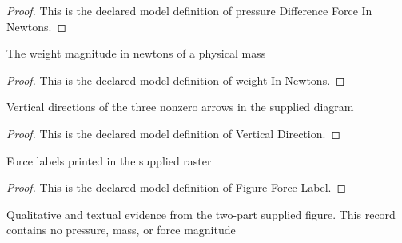 \begin{proof}
  This is the declared model definition of pressure Difference Force In Newtons.
\end{proof}
\begin{definition}
  \label{def:physics:phyx-mini-0720:phyxminiproblems-problemphyxmini0720-weightinnewtons}
  The weight magnitude in newtons of a physical mass
\end{definition}
\begin{proof}
  This is the declared model definition of weight In Newtons.
\end{proof}
\begin{definition}
  \label{def:physics:phyx-mini-0720:phyxminiproblems-problemphyxmini0720-verticaldirection}
  Vertical directions of the three nonzero arrows in the supplied diagram
\end{definition}
\begin{proof}
  This is the declared model definition of Vertical Direction.
\end{proof}
\begin{definition}
  \label{def:physics:phyx-mini-0720:phyxminiproblems-problemphyxmini0720-figureforcelabel}
  Force labels printed in the supplied raster
\end{definition}
\begin{proof}
  This is the declared model definition of Figure Force Label.
\end{proof}
\begin{definition}
  \label{def:physics:phyx-mini-0720:phyxminiproblems-problemphyxmini0720-suctioncupfigure}
  Qualitative and textual evidence from the two-part supplied figure. This record contains no pressure, mass, or force magnitude
\end{definition}
